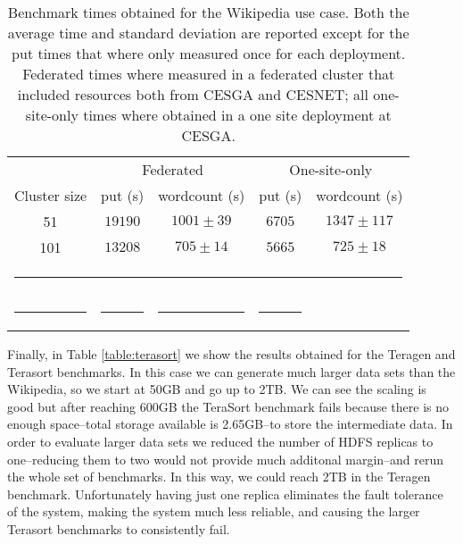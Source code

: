 \begin{table}[h!]
\caption{Benchmark times obtained for the Wikipedia use case. Both the average time and standard deviation are reported except for the put times that where only measured once for each deployment. Federated times where measured in a federated cluster that included resources both from CESGA and CESNET; all one-site-only times where obtained in a one site deployment at CESGA. }
\label{table:wikipedia}
%
\vspace{-0.5em}
%
\begin{center}
\begin{tabular}{ccccc}
\toprule
    					& \multicolumn{2}{c}{Federated} 		& \multicolumn{2}{c}{One-site-only} \\
Cluster size				& put (s)		& wordcount (s) 	& put (s)		& wordcount (s)\\
\midrule
51                   			& $19190$		& $1001\pm39$      	& $6705$		& $1347\pm117$\\
101                  			& $13208$		& $705\pm14$      	& $5665$		& $725\pm18$\\
%
\bottomrule
\multicolumn{5}{c}{\rule{0.98\textwidth}{0em}}\\
\rule{0.2\textwidth}{0cm} & \rule{0.2\textwidth}{0cm} & \rule{0.2\textwidth}{0cm} &  \rule{0.2\textwidth}{0cm} & \\
\end{tabular}
\end{center}
\end{table}


Finally, in Table \ref{table:terasort} we show the results obtained for the Teragen and Terasort benchmarks. In this case we can generate much larger data sets than the Wikipedia, so we start at 50GB and go up to 2TB. We can see the scaling is good but after reaching 600GB the TeraSort benchmark fails because there is no enough space--total storage available is 2.65GB--to store the intermediate data. In order to evaluate larger data sets we reduced the number of HDFS replicas to one--reducing them to two would not provide much additonal margin--and rerun the whole set of benchmarks. In this way, we could reach 2TB in the Teragen benchmark. Unfortunately having just one replica eliminates the fault tolerance of the system, making the system much less reliable, and causing the larger Terasort benchmarks to consistently fail.

